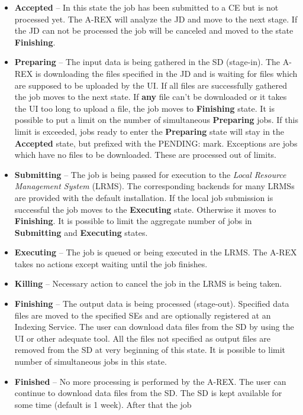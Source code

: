 \documentclass{article}                            %
\begin{document}
\begin{itemize}
\item \textbf{Accepted} -- In this state the job has been submitted to a
CE but is not processed yet. The A-REX will analyze the JD and move
to the next stage. If the JD can not be processed the job will be
canceled and moved to the state \textbf{Finishing}.
\item \textbf{Preparing} -- The input data is being gathered in the SD (stage-in).
The A-REX is downloading the files specified in the JD and is waiting
for files which are supposed to be uploaded by the UI. If all files
are successfully gathered the job moves to the next state. If \textbf{any}
file can't be downloaded or it takes the UI too long to upload a file,
the job moves to \textbf{Finishing} state. It is possible to put a
limit on the number of simultaneous \textbf{Preparing} jobs. If this
limit is exceeded, jobs ready to enter the \textbf{Preparing} state
 will stay in the \textbf{Accepted} state, but prefixed with the PENDING:
mark. Exceptions are jobs which have no files to be downloaded. These
are processed out of limits.
\item \textbf{Submitting} -- The job is being passed for execution to the
\emph{Local Resource Management System} (LRMS). The corresponding
backends for many LRMSs are provided with the default installation.
If the local job submission is successful the job moves to the \textbf{Executing}
state. Otherwise it moves to \textbf{Finishing}. It is possible to
limit the aggregate number of jobs in \textbf{Submitting} and \textbf{Executing}
states.
\item \textbf{Executing} -- The job is queued or being executed in the LRMS.
The A-REX takes no actions except waiting until the job finishes.
\item \textbf{Killing} -- Necessary action to cancel the job in the LRMS
is being taken.
\item \textbf{Finishing} -- The output data is being processed (stage-out).
Specified data files are moved to the specified SEs and are optionally
registered at an Indexing Service. The user can download data files
from the SD by using the UI or other adequate tool. All the files
not specified as output files are removed from the SD at very beginning
of this state. It is possible to limit number of simultaneous jobs
in this state.
\item \textbf{Finished} -- No more processing is performed by the A-REX.
The user can continue to download data files from the SD. The SD is
kept available for some time (default is 1 week). After that the job

\end{itemize}
\end{document}
